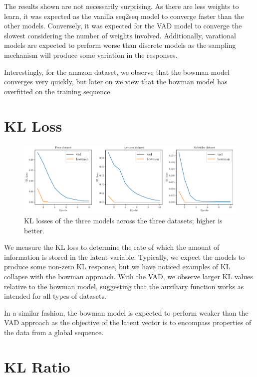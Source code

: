 \documentclass[12pt,twoside]{report}
\begin{document}
The results shown are not necessarily surprising. As there are less weights to learn, it was expected as the vanilla seq2seq model to converge faster than the other models. Conversely, it was expected for the VAD model to converge the slowest considering the number of weights involved. Additionally, varational models are expected to perform worse than discrete models as the sampling mechanism will produce some variation in the responses. 

Interestingly, for the amazon dataset, we observe that the bowman model converges very quickly, but later on we view that the bowman model has overfitted on the training sequence.

\section{KL Loss}

\begin{figure}[!ht]
	\centering
	\includegraphics[width=150mm]{results/kl_loss.pdf}
	\caption{KL losses of the three models across the three datasets; higher is better.\label{r:kl_loss}}
	\end{figure}
	
We measure the KL loss to determine the rate of which the amount of information is stored in the latent variable. Typically, we expect the models to produce some non-zero KL response, but we have noticed examples of KL collapse with the bowman approach. With the VAD, we observe larger KL values relative to the bowman model, suggesting that the auxiliary function works as intended for all types of datasets.

In a similar fashion, the bowman model is expected to perform weaker than the VAD approach as the objective of the latent vector is to encompass properties of the data from a global sequence. 

\section{KL Ratio}
\end{document}
